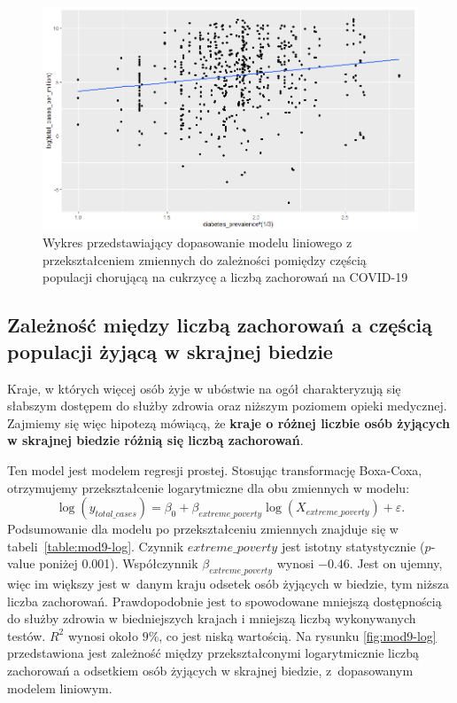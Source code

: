 \documentclass[12pt]{mwbk}
\theoremstyle{plain}
\theoremstyle{definition}
\theoremstyle{definition}
\newcommand\zrodlo[1]{\par\vspace{-3mm}{\small\textit{Źródło: }#1 }}
\begin{document}
\newpage

\begin{figure}[!ht]
	\centering
	\includegraphics[width=\linewidth]{rys/mod8-log.png}
	\caption{Wykres przedstawiający dopasowanie modelu liniowego z przekształceniem zmiennych do zależności pomiędzy częścią populacji chorującą na cukrzycę a liczbą zachorowań na COVID-19}
	\label{fig:mod8-log}
	\zrodlo{Opracowanie własne}
\end{figure}



\subsection{Zależność między liczbą zachorowań a częścią populacji żyjącą w skrajnej biedzie}

Kraje, w których więcej osób żyje w ubóstwie na ogół charakteryzują się słabszym dostępem do służby zdrowia oraz niższym poziomem opieki medycznej. Zajmiemy się więc hipotezą mówiącą, że \textbf{kraje o różnej liczbie osób żyjących w skrajnej biedzie różnią się liczbą zachorowań}.



Ten model jest modelem regresji prostej. Stosując transformację Boxa-Coxa, otrzymujemy przekształcenie logarytmiczne dla obu zmiennych w modelu:
$$\log(y_{total\_cases})=\beta_0+\beta_{extreme\_poverty}\log(X_{extreme\_poverty})+\varepsilon.$$
Podsumowanie dla modelu po przekształceniu zmiennych znajduje się w tabeli~\ref{table:mod9-log}. Czynnik $extreme\_poverty$ jest istotny statystycznie ($p$-value poniżej 0.001). Współczynnik $\beta_{extreme\_poverty}$ wynosi $-0.46$. Jest on ujemny, więc im większy jest w~danym kraju odsetek osób żyjących w biedzie, tym niższa liczba zachorowań. Prawdopodobnie jest to spowodowane mniejszą dostępnością do służby zdrowia w biedniejszych krajach i mniejszą liczbą wykonywanych testów. $R^2$ wynosi około $9\%$, co jest niską wartością. Na rysunku \ref{fig:mod9-log} przedstawiona jest zależność między przekształconymi logarytmicznie liczbą zachorowań a odsetkiem osób żyjących w skrajnej biedzie, z~dopasowanym modelem liniowym. 
\end{document}
